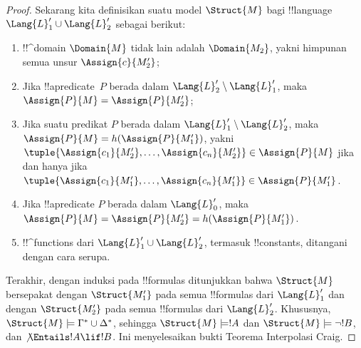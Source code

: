 \documentclass[../../../include/open-logic-section]{subfiles}
\begin{document}
\begin{proof}
Sekarang kita definisikan suatu model $\Struct{M}$ bagi !!{language}
$\Lang{L}'_1 \cup \Lang{L}'_2$ sebagai berikut:
\begin{enumerate}
\item !!^{domain} $\Domain{M}$ tidak lain adalah $\Domain{M_2}$, yakni
  himpunan semua unsur $\Assign{c}{M'_2}$;
\item Jika !!a{predicate}~$P$ berada dalam $\Lang{L}'_2 \setminus
  \Lang{L}'_1$, maka $\Assign{P}{M} = \Assign{P}{M'_2}$;
\item Jika suatu predikat $P$ berada dalam $\Lang{L}'_1\setminus
  \Lang{L}'_2$, maka $\Assign{P}{M} = h(\Assign{P}{M'_1})$, yakni
  $\tuple{\Assign{c_1}{M'_2}, \dots, \Assign{c_n}{M'_2}} \in
  \Assign{P}{M}$ jika dan hanya jika $\tuple{\Assign{c_1}{M'_1}, \dots,
  \Assign{c_n}{M'_1}} \in \Assign{P}{M'_1}$.
\item Jika !!a{predicate} $P$ berada dalam $\Lang{L}'_0$, maka
  $\Assign{P}{M} = \Assign{P}{M'_2} = h(\Assign{P}{M'_1})$.
\item !!^{function}s dari $\Lang{L}'_1 \cup \Lang{L}'_2$, termasuk
  !!{constant}s, ditangani dengan cara serupa.
\end{enumerate}

Terakhir, dengan induksi pada !!{formula}s ditunjukkan bahwa $\Struct{M}$
bersepakat dengan $\Struct{M'_1}$ pada semua !!{formula}s dari
$\Lang{L}'_1$ dan dengan $\Struct{M'_2}$ pada semua !!{formula}s dari
$\Lang{L}'_2$. Khususnya, $\Struct{M} \models \Gamma^* \cup \Delta^*$,
sehingga $\Struct{M} \models !A$ dan $\Struct{M} \models \lnot!B$, dan
$\not\Entails !A \lif !B$. Ini menyelesaikan bukti Teorema Interpolasi
Craig.
\end{proof}
\end{document}
